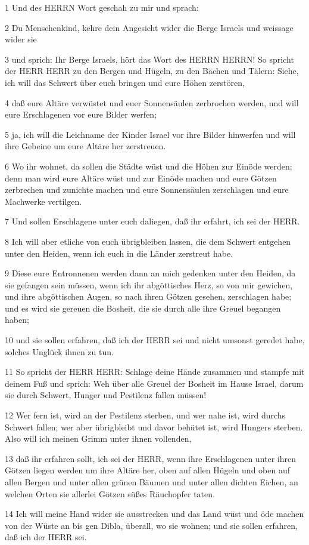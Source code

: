 \par 1 Und des HERRN Wort geschah zu mir und sprach:
\par 2 Du Menschenkind, kehre dein Angesicht wider die Berge Israels und weissage wider sie
\par 3 und sprich: Ihr Berge Israels, hört das Wort des HERRN HERRN! So spricht der HERR HERR zu den Bergen und Hügeln, zu den Bächen und Tälern: Siehe, ich will das Schwert über euch bringen und eure Höhen zerstören,
\par 4 daß eure Altäre verwüstet und euer Sonnensäulen zerbrochen werden, und will eure Erschlagenen vor eure Bilder werfen;
\par 5 ja, ich will die Leichname der Kinder Israel vor ihre Bilder hinwerfen und will ihre Gebeine um eure Altäre her zerstreuen.
\par 6 Wo ihr wohnet, da sollen die Städte wüst und die Höhen zur Einöde werden; denn man wird eure Altäre wüst und zur Einöde machen und eure Götzen zerbrechen und zunichte machen und eure Sonnensäulen zerschlagen und eure Machwerke vertilgen.
\par 7 Und sollen Erschlagene unter euch daliegen, daß ihr erfahrt, ich sei der HERR.
\par 8 Ich will aber etliche von euch übrigbleiben lassen, die dem Schwert entgehen unter den Heiden, wenn ich euch in die Länder zerstreut habe.
\par 9 Diese eure Entronnenen werden dann an mich gedenken unter den Heiden, da sie gefangen sein müssen, wenn ich ihr abgöttisches Herz, so von mir gewichen, und ihre abgöttischen Augen, so nach ihren Götzen gesehen, zerschlagen habe; und es wird sie gereuen die Bosheit, die sie durch alle ihre Greuel begangen haben;
\par 10 und sie sollen erfahren, daß ich der HERR sei und nicht umsonst geredet habe, solches Unglück ihnen zu tun.
\par 11 So spricht der HERR HERR: Schlage deine Hände zusammen und stampfe mit deinem Fuß und sprich: Weh über alle Greuel der Bosheit im Hause Israel, darum sie durch Schwert, Hunger und Pestilenz fallen müssen!
\par 12 Wer fern ist, wird an der Pestilenz sterben, und wer nahe ist, wird durchs Schwert fallen; wer aber übrigbleibt und davor behütet ist, wird Hungers sterben. Also will ich meinen Grimm unter ihnen vollenden,
\par 13 daß ihr erfahren sollt, ich sei der HERR, wenn ihre Erschlagenen unter ihren Götzen liegen werden um ihre Altäre her, oben auf allen Hügeln und oben auf allen Bergen und unter allen grünen Bäumen und unter allen dichten Eichen, an welchen Orten sie allerlei Götzen süßes Räuchopfer taten.
\par 14 Ich will meine Hand wider sie ausstrecken und das Land wüst und öde machen von der Wüste an bis gen Dibla, überall, wo sie wohnen; und sie sollen erfahren, daß ich der HERR sei.

